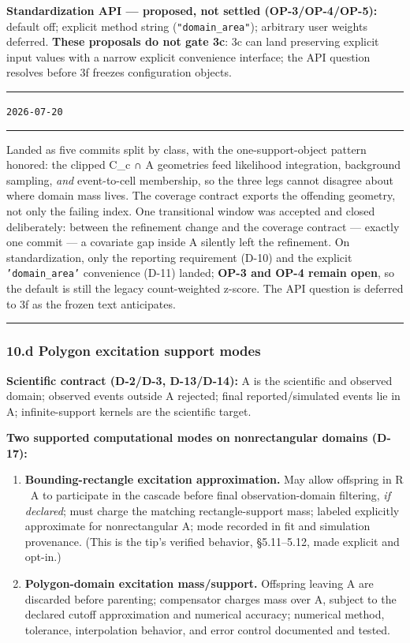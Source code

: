 \documentclass[
  10pt,
]{article}
\providecommand{\tightlist}{%
  \setlength{\itemsep}{0pt}\setlength{\parskip}{0pt}}
\newenvironment{amendment}[2]{%
  \par\medskip\noindent
  {\color{amdcolor}\rule{\linewidth}{1pt}}\par\nobreak
  \vspace{-0.45\baselineskip}
  \noindent{\color{amdcolor}\textbf{#1}}\hfill{\color{amdcolor}\small\texttt{#2}}\par\nobreak
  \vspace{-0.35\baselineskip}
  {\color{amdcolor}\rule{\linewidth}{0.4pt}}\par\nobreak\smallskip
}{%
  \par\nobreak\vspace{-0.25\baselineskip}
  {\color{amdcolor}\rule{\linewidth}{1pt}}\par\medskip
}
\begin{document}
\textbf{Standardization API --- proposed, not settled (OP-3/OP-4/OP-5):} default off; explicit method string (\texttt{"domain\_area"}); arbitrary user weights deferred. \textbf{These proposals do not gate 3c}: 3c can land preserving explicit input values with a narrow explicit convenience interface; the API question resolves before 3f freezes configuration objects.

\begin{amendment}{A-5 --- 10.c as implemented}{2026-07-20}
Landed as five commits split by class, with the one-support-object pattern honored: the clipped C\_c ∩ A geometries feed likelihood integration, background sampling, \emph{and} event-to-cell membership, so the three legs cannot disagree about where domain mass lives. The coverage contract exports the offending geometry, not only the failing index. One transitional window was accepted and closed deliberately: between the refinement change and the coverage contract --- exactly one commit --- a covariate gap inside A silently left the refinement. On standardization, only the reporting requirement (D-10) and the explicit \texttt{'domain\_area'} convenience (D-11) landed; \textbf{OP-3 and OP-4 remain open}, so the default is still the legacy count-weighted z-score. The API question is deferred to 3f as the frozen text anticipates.
\end{amendment}

\hypertarget{d-polygon-excitation-support-modes}{%
\subsubsection{10.d Polygon excitation support modes}\label{d-polygon-excitation-support-modes}}

\textbf{Scientific contract (D-2/D-3, D-13/D-14):} A is the scientific and observed domain; observed events outside A rejected; final reported/simulated events lie in A; infinite-support kernels are the scientific target.

\textbf{Two supported computational modes on nonrectangular domains (D-17):}

\begin{enumerate}
\def\labelenumi{\arabic{enumi}.}
\tightlist
\item
  \textbf{Bounding-rectangle excitation approximation.} May allow offspring in R ~A to participate in the cascade before final observation-domain filtering, \emph{if declared}; must charge the matching rectangle-support mass; labeled explicitly approximate for nonrectangular A; mode recorded in fit and simulation provenance. (This is the tip's verified behavior, §5.11--5.12, made explicit and opt-in.)
\item
  \textbf{Polygon-domain excitation mass/support.} Offspring leaving A are discarded before parenting; compensator charges mass over A, subject to the declared cutoff approximation and numerical accuracy; numerical method, tolerance, interpolation behavior, and error control documented and tested.
\end{enumerate}
\end{document}
